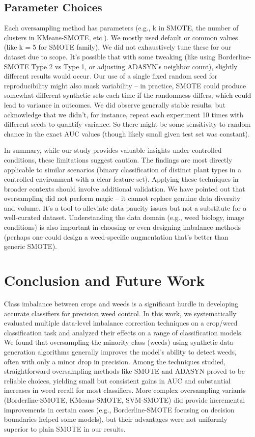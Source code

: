 \documentclass[agriengineering,article,submit,pdftex,moreauthors]{Definitions/mdpi}
\begin{document}
\subsection{Parameter Choices}
Each oversampling method has parameters (e.g., k in SMOTE, the number of clusters in KMeans-SMOTE, etc.). We mostly used default or common values (like k = 5 for SMOTE family). We did not exhaustively tune these for our dataset due to scope. It’s possible that with some tweaking (like using Borderline-SMOTE Type 2 vs Type 1, or adjusting ADASYN’s neighbor count), slightly different results would occur. Our use of a single fixed random seed for reproducibility might also mask variability – in practice, SMOTE could produce somewhat different synthetic sets each time if the randomness differs, which could lead to variance in outcomes. We did observe generally stable results, but acknowledge that we didn’t, for instance, repeat each experiment 10 times with different seeds to quantify variance. So there might be some sensitivity to random chance in the exact AUC values (though likely small given test set was constant).

In summary, while our study provides valuable insights under controlled conditions, these limitations suggest caution. The findings are most directly applicable to similar scenarios (binary classification of distinct plant types in a controlled environment with a clear feature set). Applying these techniques in broader contexts should involve additional validation. We have pointed out that oversampling did not perform magic – it cannot replace genuine data diversity and volume. It’s a tool to alleviate data paucity issues but not a substitute for a well-curated dataset. Understanding the data domain (e.g., weed biology, image conditions) is also important in choosing or even designing imbalance methods (perhaps one could design a weed-specific augmentation that’s better than generic SMOTE).

\section{Conclusion and Future Work}
\label{section:conclusion}
Class imbalance between crops and weeds is a significant hurdle in developing accurate classifiers for precision weed control. In this work, we systematically evaluated multiple data-level imbalance correction techniques on a crop/weed classification task and analyzed their effects on a range of classification models. We found that oversampling the minority class (weeds) using synthetic data generation algorithms generally improves the model’s ability to detect weeds, often with only a minor drop in precision. Among the techniques studied, straightforward oversampling methods like SMOTE and ADASYN proved to be reliable choices, yielding small but consistent gains in AUC and substantial increases in weed recall for most classifiers. More complex oversampling variants (Borderline-SMOTE, KMeans-SMOTE, SVM-SMOTE) did provide incremental improvements in certain cases (e.g., Borderline-SMOTE focusing on decision boundaries helped some models), but their advantages were not uniformly superior to plain SMOTE in our results.
\end{document}
